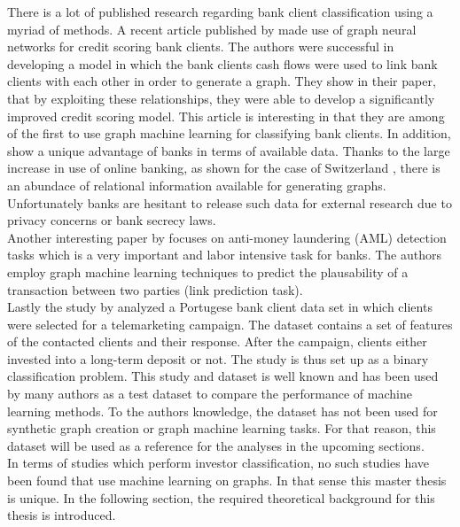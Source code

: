 	There is a lot of published research regarding bank client classification
	using a myriad of methods. A recent article published by
	\cite{sukharev2020ews} made use of graph neural networks for credit scoring
	bank clients. The authors were successful in developing a model in which
	the bank clients cash flows were used to link bank clients with each other
	in order to generate a graph. They show in their paper, that by exploiting
	these relationships, they were able to develop a significantly improved
	credit scoring model. This article is interesting in that they are among of
	the first to use graph machine learning for classifying bank clients. In
	addition, \cite{sukharev2020ews} show a unique advantage of banks in terms
	of available data. Thanks to the large increase in use of online banking, as
	shown for the case of Switzerland \citep{Statistapayment}, there is an
	abundace of relational information available for generating graphs.
	Unfortunately banks are hesitant to release such data for external research 
	due to privacy concerns or bank secrecy laws. \\

	\noindent Another interesting paper by \cite{weber2018scalable} focuses on 
	anti-money laundering (AML) detection tasks which is a very important and 
	labor intensive task for banks. The authors employ graph machine learning
	techniques to predict the plausability of a transaction between two parties
	(link prediction task). \\

	\noindent Lastly the study by \cite{moro2014data} analyzed a Portugese bank client
	data set in which clients were selected for a telemarketing campaign. The
	dataset contains a set of features of the contacted clients and their
	response. After the campaign, clients either invested into a long-term
	deposit or not. The study is thus set up as a binary classification
	problem. This study and dataset is well known and has been used by many
	authors as a test dataset to compare the performance of machine learning
	methods. To the authors knowledge, the dataset has not been used for
	synthetic graph creation or graph machine learning tasks. For that reason,
	this dataset will be used as a reference for the analyses in the upcoming
	sections. \\

	\noindent In terms of studies which perform investor classification, no
	such studies have been found that use machine learning on graphs. In that
	sense this master thesis is unique. In the following section, the required
	theoretical background for this thesis is introduced. 



